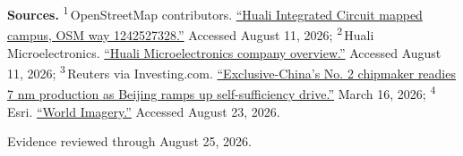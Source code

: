 \begin{minipage}[t][0.90\textheight][t]{\textwidth}
{\sffamily\scriptsize\setlength{\emergencystretch}{1.5em}\textbf{Sources.} \textsuperscript{1}\,OpenStreetMap contributors. \href{\detokenize{https://www.openstreetmap.org/way/1242527328}}{\enquote{Huali Integrated Circuit mapped campus, OSM way 1242527328.}} Accessed August 11, 2026; \textsuperscript{2}\,Huali Microelectronics. \href{\detokenize{https://www.hlmc.cn/aboutUs}}{\enquote{Huali Microelectronics company overview.}} Accessed August 11, 2026; \textsuperscript{3}\,Reuters via Investing.com. \href{\detokenize{https://www.investing.com/news/stock-market-news/exclusivechinas-no-2-chipmaker-readies-7-nm-production-as-beijing-ramps-up-selfsuffiency-drive-4561633}}{\enquote{Exclusive-China's No. 2 chipmaker readies 7 nm production as Beijing ramps up self-sufficiency drive.}} March 16, 2026; \textsuperscript{4}\,Esri. \href{\detokenize{https://www.arcgis.com/home/item.html?id=10df2279f9684e4a9f6a7f08febac2a9}}{\enquote{World Imagery.}} Accessed August 23, 2026.\par}
\vfill
\noindent{\color{hairline}\rule{\linewidth}{0.4pt}}\par\smallskip
{\sffamily\scriptsize\color{black!58} Evidence reviewed through August 25, 2026.\par}
\end{minipage}
\clearpage
